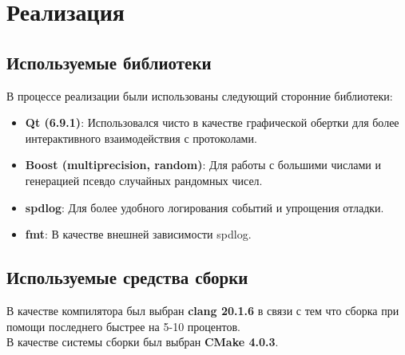 \section{Реализация}

\subsection{Используемые библиотеки}

В процессе реализации были использованы следующий сторонние библиотеки: 
\begin{itemize}
    \item \textbf{Qt (6.9.1)}: Использовался чисто в качестве графической обертки для более интерактивного взаимодействия с протоколами.
    \item \textbf{Boost (multiprecision, random)}: Для работы с большими числами и генерацией псевдо случайных рандомных чисел. 
    \item \textbf{spdlog}: Для более удобного логирования событий и упрощения отладки. 
    \item \textbf{fmt}: В качестве внешней зависимости spdlog.
\end{itemize}

\subsection{Используемые средства сборки}

В качестве компилятора был выбран \textbf{clang 20.1.6} в связи с тем что сборка при помощи последнего быстрее на 5-10 процентов.\\

В качестве системы сборки был выбран \textbf{CMake 4.0.3}.



